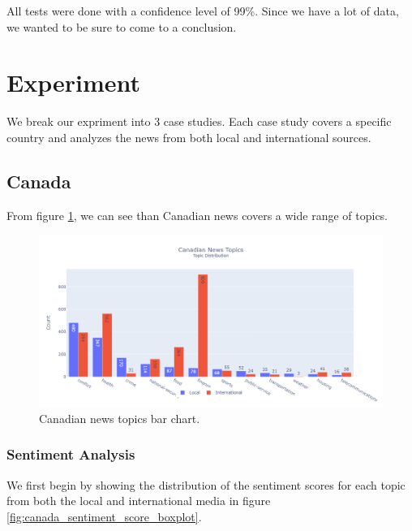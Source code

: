\documentclass{article}
\theoremstyle{mytheoremstyle}
\theoremstyle{mytheoremstyle}
\theoremstyle{myproblemstyle}
\begin{document}
    All tests were done with a confidence level of 99\%. Since we have a lot of data, we wanted to be sure to come to a conclusion. 

    \section{Experiment}
    
    We break our expriment into 3 case studies. Each case study covers a specific country and analyzes the news from both local and international sources.

    \subsection{Canada}
    From figure \ref{fig:canada_topic}, we can see than Canadian news covers a wide range of topics.
    
    \begin{figure}[hp]
        \centering
        \includegraphics[width=\linewidth]{../images/plots/Canada/canada_barchart_topics.png}
        \caption{Canadian news topics bar chart.}
        \label{fig:canada_topic}
    \end{figure}

    \subsubsection{Sentiment Analysis}

    We first begin by showing the distribution of the sentiment scores for each topic from both the local and international media in figure \ref{fig:canada_sentiment_score_boxplot}. 
    
\end{document}
